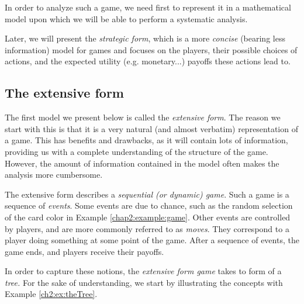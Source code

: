 In order to analyze such a game, we need first to represent it in a mathematical model upon which we will be able to perform a systematic analysis.



 Later, we will present the   \emph{strategic form}, which is a more \emph{concise} (bearing less information) model for games and focuses on the players,  their possible choices of actions, and the expected utility (e.g. monetary...) payoffs  these actions lead to.


\subsection{The extensive form}
\label{subsec:ExtForm}
The first model we present below is called the \emph{extensive form}.
The reason we start with this is that it is a very natural (and almost verbatim) representation of a game.  This has benefits and drawbacks, as it will contain lots of information,  providing us with a complete understanding of the structure of the game. However,  the amount of information  contained in the model
 often makes the analysis more cumbersome.


The extensive form describes a \emph{sequential (or dynamic) game}. Such a game is a sequence of \emph{events}.
Some events are due to chance, such as the random selection of the card color in Example \ref{chap2:example:game}.
Other events are controlled by players, and are more commonly referred to as \emph{moves}.
They correspond to a player doing something at some point of the game.
After a sequence of events, the game ends, and players receive their payoffs.

In order to capture these notions, the \emph{extensive form game} takes to form of a \emph{tree.}
 For the sake of understanding, we start by illustrating the concepts with Example \ref{ch2:ex:theTree}.


